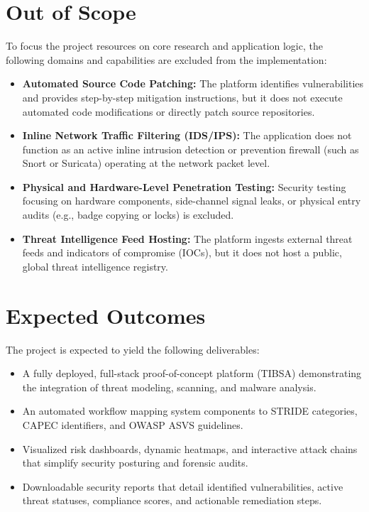 \section{Out of Scope}

To focus the project resources on core research and application logic, the following domains and capabilities are excluded from the implementation:

\begin{itemize}
    \item \textbf{Automated Source Code Patching:} The platform identifies vulnerabilities and provides step-by-step mitigation instructions, but it does not execute automated code modifications or directly patch source repositories.
    \item \textbf{Inline Network Traffic Filtering (IDS/IPS):} The application does not function as an active inline intrusion detection or prevention firewall (such as Snort or Suricata) operating at the network packet level.
    \item \textbf{Physical and Hardware-Level Penetration Testing:} Security testing focusing on hardware components, side-channel signal leaks, or physical entry audits (e.g., badge copying or locks) is excluded.
    \item \textbf{Threat Intelligence Feed Hosting:} The platform ingests external threat feeds and indicators of compromise (IOCs), but it does not host a public, global threat intelligence registry.
\end{itemize}

\section{Expected Outcomes}

The project is expected to yield the following deliverables:

\begin{itemize}
    \item A fully deployed, full-stack proof-of-concept platform (TIBSA) demonstrating the integration of threat modeling, scanning, and malware analysis.
    \item An automated workflow mapping system components to STRIDE categories, CAPEC identifiers, and OWASP ASVS guidelines.
    \item Visualized risk dashboards, dynamic heatmaps, and interactive attack chains that simplify security posturing and forensic audits.
    \item Downloadable security reports that detail identified vulnerabilities, active threat statuses, compliance scores, and actionable remediation steps.
\end{itemize}

